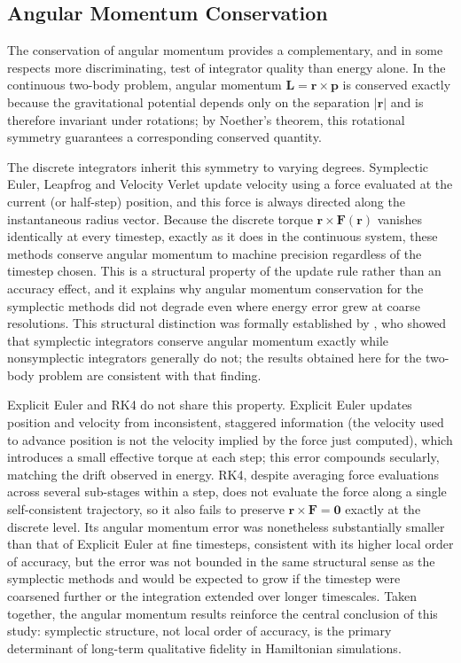 \subsection{Angular Momentum Conservation}

The conservation of angular momentum provides a complementary, and in some respects more discriminating, test
of integrator quality than energy alone. In the continuous two-body problem, angular momentum
$\mathbf{L} = \mathbf{r} \times \mathbf{p}$ is conserved exactly because the gravitational potential depends
only on the separation $|\mathbf{r}|$ and is therefore invariant under rotations; by Noether's theorem, this
rotational symmetry guarantees a corresponding conserved quantity.

The discrete integrators inherit this symmetry to varying degrees. Symplectic Euler, Leapfrog and Velocity
Verlet update velocity using a force evaluated at the current (or half-step) position, and this force is
always directed along the instantaneous radius vector. Because the discrete torque $\mathbf{r} \times
\mathbf{F}(\mathbf{r})$ vanishes identically at every timestep, exactly as it does in the continuous system,
these methods conserve angular momentum to machine precision regardless of the timestep chosen. This is a
structural property of the update rule rather than an accuracy effect, and it explains why angular momentum
conservation for the symplectic methods did not degrade even where energy error grew at coarse resolutions.
This structural distinction was formally established by \citet{zhang1995}, who showed that symplectic
integrators conserve angular momentum exactly while nonsymplectic integrators generally do not; the results
obtained here for the two-body problem are consistent with that finding.

Explicit Euler and RK4 do not share this property. Explicit Euler updates position and velocity from
inconsistent, staggered information (the velocity used to advance position is not the velocity implied by
the force just computed), which introduces a small effective torque at each step; this error compounds
secularly, matching the drift observed in energy. RK4, despite averaging force evaluations across several
sub-stages within a step, does not evaluate the force along a single self-consistent trajectory, so it also
fails to preserve $\mathbf{r} \times \mathbf{F} = \mathbf{0}$ exactly at the discrete level. Its angular
momentum error was nonetheless substantially smaller than that of Explicit Euler at fine timesteps, consistent
with its higher local order of accuracy, but the error was not bounded in the same structural sense as the
symplectic methods and would be expected to grow if the timestep were coarsened further or the integration
extended over longer timescales. Taken together, the angular momentum results reinforce the central conclusion
of this study: symplectic structure, not local order of accuracy, is the primary determinant of long-term
qualitative fidelity in Hamiltonian simulations.

